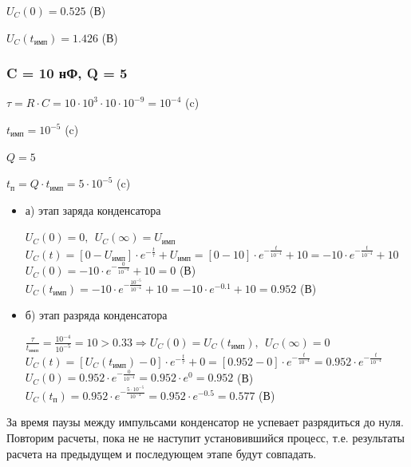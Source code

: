 	$U_C(0) = 0.525$ (В)
	
	$U_C(t_\text{имп}) = 1.426$ (В)
	
\subsubsection{C = 10 нФ, Q = 5}

		$\tau = R \cdot C = 10 \cdot 10^3 \cdot 10 \cdot 10^{-9} = 10^{-4}$ (c)
		
		$t_\text{имп} = 10^{-5}$ (c)
		
		$Q = 5$		
		
		$t_\text{п} = Q \cdot t_\text{имп} = 5 \cdot 10^{-5}$ (c)
		
		
\begin{itemize}
\item[] а) этап заряда конденсатора

		$U_C(0) = 0,\ \ U_C(\infty) = U_\text{имп}$\\	
		$U_C(t) = [0 - U_\text{имп}] \cdot e^{-\frac{t}{\tau}} + U_\text{имп} = [0 - 10] \cdot e^{-\frac{t}{10^{-4}}} + 10 = -10 \cdot e^{-\frac{t}{10^{-4}}} + 10$\\
		$U_C(0) = -10 \cdot e^{-\frac{0}{10^{-4}}} + 10 = 0$ (В)\\
		$U_C(t_\text{имп}) = -10 \cdot e^{-\frac{10^{-5}}{10^{-4}}} + 10 = -10 \cdot e^{-0.1} + 10 = 0.952$ (В)\\
		
\item[] б) этап разряда конденсатора
	
		$\frac{\tau}{t_\text{имп}} = \frac{10^{-4}}{10^{-5}} = 10 > 0.33 \Rightarrow U_C(0) = U_C(t_\text{имп}),\ \ U_C(\infty) = 0$\\
		$U_C(t) = [U_C(t_\text{имп}) - 0] \cdot e^{-\frac{t}{\tau}} + 0 =  [0.952 - 0] \cdot e^{-\frac{t}{10^{-4}}} = 0.952 \cdot e^{-\frac{t}{10^{-4}}}$\\
		$U_C(0) = 0.952 \cdot e^{-\frac{0}{10^{-4}}} = 0.952 \cdot e^0 = 0.952$ (В)\\
		$U_C(t_\text{п}) = 0.952 \cdot e^{-\frac{5 \cdot 10^{-5}}{10^{-4}}} = 0.952 \cdot e^{-0.5} = 0.577$ (В)\\
		
\end{itemize}				
		
За время паузы между импульсами конденсатор не успевает разрядиться до нуля. Повторим расчеты, пока не не наступит установившийся процесс, т.е. результаты расчета на предыдущем и последующем этапе будут совпадать.	
	
